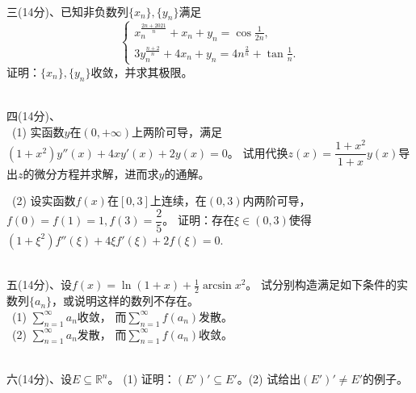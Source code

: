~\\
三(14分)、已知非负数列$\{x_n\},\{y_n\}$满足
\[\begin{cases}
\displaystyle x_n^{\frac{2n+2021}{n}}+x_n+y_n=\cos\frac{1}{2n},\\
\displaystyle 3y_n^{\frac{n+2}{n}}+4x_n+y_n=4n^{\frac{2}{n}}+\tan\frac{1}{n}.
\end{cases}\]
证明：$\{x_n\},\{y_n\}$收敛，并求其极限。

~\\
四(14分)、\\
\quad\ (1) 实函数$y$在$(0,+\infty)$上两阶可导，满足$(1+x^2)y''(x)+4xy'(x)+2y(x)=0$。
试用代换$z(x)=\dfrac{1+x^2}{1+x}y(x)$导出$z$的微分方程并求解，进而求$y$的通解。

\quad\ (2) 设实函数$f(x)$在$[0,3]$上连续，在$(0,3)$内两阶可导，$f(0)=f(1)=1,f(3)=\dfrac{2}{5}$。
证明：存在$\xi \in (0,3)$使得$(1+\xi^2)f''(\xi)+4\xi f'(\xi)+2f(\xi)=0$.

~\\
五(14分)、设$\displaystyle f(x)=\ln(1+x)+\frac{1}{2}\arcsin x^2$。
试分别构造满足如下条件的实数列$\{a_n\}$，或说明这样的数列不存在。\\
\quad\ (1) $\displaystyle \sum\limits_{n=1}^{\infty}a_n$收敛，
而$\displaystyle \sum\limits_{n=1}^{\infty}f(a_n)$发散。\\
\quad\ (2) $\displaystyle \sum\limits_{n=1}^{\infty}a_n$发散，
而$\displaystyle \sum\limits_{n=1}^{\infty}f(a_n)$收敛。

~\\
六(14分)、设$E \subseteq \mathbb{R}^n$。
(1) 证明：$(E')' \subseteq E'$。(2) 试给出$(E')' \neq E'$的例子。


